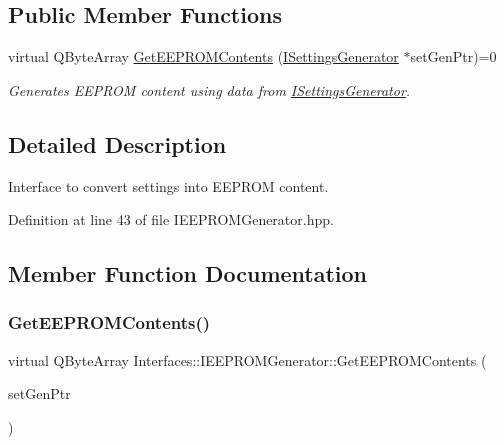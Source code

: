 \subsection*{Public Member Functions}
\begin{DoxyCompactItemize}
\item 
virtual Q\+Byte\+Array \hyperlink{class_interfaces_1_1_i_e_e_p_r_o_m_generator_a9d248220e0f557cf6c6b450ed84281dd}{Get\+E\+E\+P\+R\+O\+M\+Contents} (\hyperlink{class_interfaces_1_1_i_settings_generator}{I\+Settings\+Generator} $\ast$set\+Gen\+Ptr)=0
\begin{DoxyCompactList}\small\item\em Generates E\+E\+P\+R\+OM content using data from \hyperlink{class_interfaces_1_1_i_settings_generator}{I\+Settings\+Generator}. \end{DoxyCompactList}\end{DoxyCompactItemize}


\subsection{Detailed Description}
Interface to convert settings into E\+E\+P\+R\+OM content. 

Definition at line 43 of file I\+E\+E\+P\+R\+O\+M\+Generator.\+hpp.



\subsection{Member Function Documentation}
\mbox{\label{class_interfaces_1_1_i_e_e_p_r_o_m_generator_a9d248220e0f557cf6c6b450ed84281dd}} 
\subsubsection{\texorpdfstring{Get\+E\+E\+P\+R\+O\+M\+Contents()}{GetEEPROMContents()}}
{\footnotesize\ttfamily virtual Q\+Byte\+Array Interfaces\+::\+I\+E\+E\+P\+R\+O\+M\+Generator\+::\+Get\+E\+E\+P\+R\+O\+M\+Contents (\begin{DoxyParamCaption}\item[{\hyperlink{class_interfaces_1_1_i_settings_generator}{I\+Settings\+Generator} $\ast$}]{set\+Gen\+Ptr }\end{DoxyParamCaption})\hspace{0.3cm}{\ttfamily [pure virtual]}}



